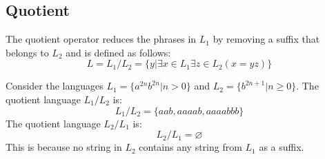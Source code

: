 \subsection*{Quotient} 
The quotient operator reduces the phrases in $L_1$ by removing a suffix that belongs to $L_2$ and is defined as follows:
\[L=L_1/L_2=\{y|\exists x \in L_1 \exists z \in L_2 (x=yz)\}\]
\begin{example}
    Consider the languages $L_1=\{a^{2n}b^{2n}|n>0\}$ and $L_2=\{b^{2n+1}|n \geq 0\}$. 
    The quotient language $L_1/L_2$ is:
    \[L_1/L_2=\{aab,aaaab,aaaabbb\}\]
    The quotient language $L_2/L_1$ is:
    \[L_2/L_1=\varnothing\]
    This is because no string in $L_2$ contains any string from $L_1$ as a suffix.
\end{example}